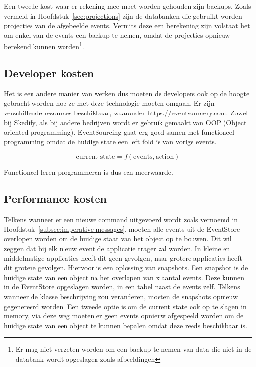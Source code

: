 Een tweede kost waar er rekening mee moet worden gehouden zijn backups. Zoals vermeld in Hoofdstuk~\ref{sec:projections} zijn de databanken die gebruikt worden projecties van de afgebeelde events. Vermits deze een berekening zijn volstaat het om enkel van de events een backup te nemen, omdat de projecties opnieuw berekend kunnen worden\footnote{Er mag niet vergeten worden om een backup te nemen van data die niet in de databank wordt opgeslagen zoals afbeeldingen}.

\subsection{Developer kosten}
\label{subsec:developer-kosten}

Het is een andere manier van werken dus moeten de developers ook op de hoogte gebracht worden hoe ze met deze technologie moeten omgaan. Er zijn verschillende resources beschikbaar, waaronder https://eventsourcery.com. Zowel bij Skedify, als bij andere bedrijven wordt er gebruik gemaakt van OOP (Object oriented programming). EventSourcing gaat erg goed samen met functioneel programming omdat de huidige state een left fold is van vorige events.

\begin{equation}
\text{current state} = f(\text{events}, \text{action})
\end{equation}

Functioneel leren programmeren is dus een meerwaarde.

\subsection{Performance kosten}
\label{subsec:performance-kosten}

Telkens wanneer er een nieuwe command uitgevoerd wordt zoals vernoemd in Hoofdstuk~\ref{subsec:imperative-messages}, moeten alle events uit de EventStore overlopen worden om de huidige staat van het object op te bouwen. Dit wil zeggen dat bij elk nieuw event de applicatie trager zal worden. In kleine en middelmatige applicaties heeft dit geen gevolgen, naar grotere applicaties heeft dit grotere gevolgen. Hiervoor is een oplossing van snapshots. Een snapshot is de huidige state van een object na het overlopen van x aantal events. Deze kunnen in de EventStore opgeslagen worden, in een tabel naast de events zelf. Telkens wanneer de klasse beschrijving zou veranderen, moeten de snapshots opnieuw gegenereerd worden. Een tweede optie is om de current state ook op te slagen in memory, via deze weg moeten er geen events opnieuw afgespeeld worden om de huidige state van een object te kunnen bepalen omdat deze reeds beschikbaar is.